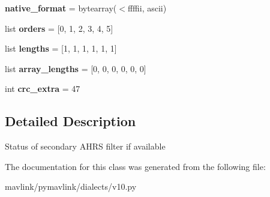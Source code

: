 \begin{DoxyCompactItemize}
{\bfseries native\+\_\+format} = bytearray(\textquotesingle{}$<$ffffii\textquotesingle{}, \textquotesingle{}ascii\textquotesingle{})
\item 
\mbox{\label{classpymavlink_1_1dialects_1_1v10_1_1MAVLink__ahrs2__message_a57418563b0ca1d0f11962156e2269b95}} 
list {\bfseries orders} = \mbox{[}0, 1, 2, 3, 4, 5\mbox{]}
\item 
\mbox{\label{classpymavlink_1_1dialects_1_1v10_1_1MAVLink__ahrs2__message_af91919a2f6986062809f65f196a91e50}} 
list {\bfseries lengths} = \mbox{[}1, 1, 1, 1, 1, 1\mbox{]}
\item 
\mbox{\label{classpymavlink_1_1dialects_1_1v10_1_1MAVLink__ahrs2__message_a82797962137bbb6eda69d1315015fdbd}} 
list {\bfseries array\+\_\+lengths} = \mbox{[}0, 0, 0, 0, 0, 0\mbox{]}
\item 
\mbox{\label{classpymavlink_1_1dialects_1_1v10_1_1MAVLink__ahrs2__message_a011188e5b7d4c5d4a936ddd473f1715b}} 
int {\bfseries crc\+\_\+extra} = 47
\end{DoxyCompactItemize}


\subsection{Detailed Description}
\begin{DoxyVerb}Status of secondary AHRS filter if available
\end{DoxyVerb}
 

The documentation for this class was generated from the following file\+:\begin{DoxyCompactItemize}
\item 
mavlink/pymavlink/dialects/v10.\+py\end{DoxyCompactItemize}
